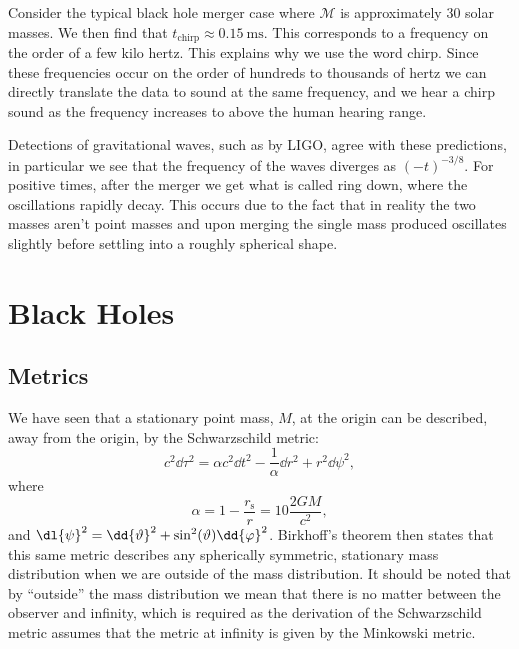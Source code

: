 \documentclass[fleqn]{NotesClass}
\begin{document}
    Consider the typical black hole merger case where \(\mathcal{M}\) is approximately 30 solar masses.
    We then find that \(t_{\mathrm{chirp}} \approx \qty{0.15}{\milli\second}\).
    This corresponds to a frequency on the order of a few kilo hertz.
    This explains why we use the word chirp.
    Since these frequencies occur on the order of hundreds to thousands of hertz we can directly translate the data to sound at the same frequency, and we hear a chirp sound as the frequency increases to above the human hearing range.
    
    Detections of gravitational waves, such as by LIGO, agree with these predictions, in particular we see that the frequency of the waves diverges as \((-t)^{-3/8}\).
    For positive times, after the merger we get what is called ring down, where the oscillations rapidly decay.
    This occurs due to the fact that in reality the two masses aren't point masses and upon merging the single mass produced oscillates slightly before settling into a roughly spherical shape.
    
    \chapter{Black Holes}
    \section{Metrics}
    We have seen that a stationary point mass, \(M\), at the origin can be described, away from the origin, by the Schwarzschild metric:
    \begin{equation}
        c^2\dd{\tau}^2 = \alpha c^2\dd{t}^2 - \frac{1}{\alpha}\dd{r}^2 + r^2\dd{\psi}^2,
    \end{equation}
    where
    \begin{equation}
        \alpha = 1 - \frac{r_{\mathrm{s}}}{r} = 1 0 \frac{2GM}{c^2},
    \end{equation}
    and \(\dl{\psi}^2 = \dd{\vartheta}^2 + \sin^2(\vartheta)\dd{\varphi}^2\).
    Birkhoff's theorem then states that this same metric describes any spherically symmetric, stationary mass distribution when we are outside of the mass distribution.
    It should be noted that by \enquote{outside} the mass distribution we mean that there is no matter between the observer and infinity, which is required as the derivation of the Schwarzschild metric assumes that the metric at infinity is given by the Minkowski metric.
    
\end{document}
